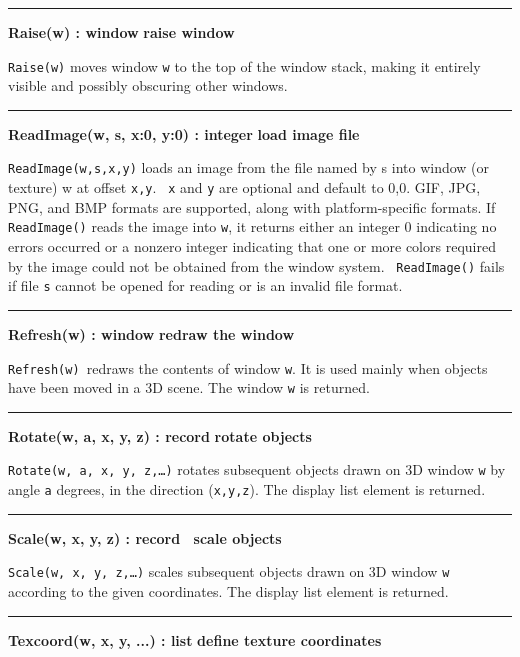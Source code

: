 \bigskip\hrule\vspace{0.1cm}
\noindent
{\bf Raise(w) : window } \hfill {\bf raise window}

\noindent
\texttt{Raise(w)} moves window \texttt{w} to the top of the window
stack, making it entirely visible and possibly obscuring other windows.

\bigskip\hrule\vspace{0.1cm}
\noindent
{\bf ReadImage(w, s, x:0, y:0) : integer } \hfill {\bf load image file}

\noindent
\texttt{ReadImage(w,s,x,y)} loads an image from the file named by s into
window (or texture) w at offset \texttt{x,y}. \texttt{\ x} and \texttt{y} are
optional and default to 0,0. GIF, JPG, PNG, and BMP formats are supported,
along with platform-specific formats. If \texttt{ReadImage()} reads the
image into \texttt{w}, it returns either an integer 0 indicating no
errors occurred or a nonzero integer indicating that one or more colors
required by the image could not be obtained from the window system.
\ \texttt{ReadImage()} fails if file \texttt{s} cannot be opened for
reading or is an invalid file format.

\bigskip\hrule\vspace{0.1cm}
\noindent
{\bf Refresh(w) : window } \hfill {\bf redraw the window}

\noindent
\texttt{Refresh(w) }redraws the contents of window \texttt{w}. It is
used mainly when objects have been moved in a 3D scene. The window
\texttt{w} is returned. 

\bigskip\hrule\vspace{0.1cm}
\noindent
{\bf Rotate(w, a, x, y, z) : record } \hfill {\bf rotate objects}

\noindent
\texttt{Rotate(w, a, x, y, z,{\dots})} rotates subsequent objects drawn
on 3D window \texttt{w} by angle \texttt{a} degrees, in the direction
(\texttt{x,y,z}). The display list element is returned.

\bigskip\hrule\vspace{0.1cm}
\noindent
{\bf Scale(w, x, y, z) : record \hfill\ scale objects}

\noindent
\texttt{Scale(w, x, y, z,{\dots})} scales subsequent objects drawn on 3D
window \texttt{w} according to the given coordinates. The display list
element is returned.

\bigskip\hrule\vspace{0.1cm}
\noindent
{\bf Texcoord(w, x, y, ...) : list } \hfill {\bf define texture coordinates}

